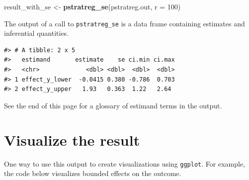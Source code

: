\documentclass[
]{book}
\newenvironment{Shaded}{\begin{snugshade}}{\end{snugshade}}
\newcommand{\AttributeTok}[1]{\textcolor[rgb]{0.13,0.29,0.53}{#1}}
\newcommand{\DecValTok}[1]{\textcolor[rgb]{0.00,0.00,0.81}{#1}}
\newcommand{\FunctionTok}[1]{\textcolor[rgb]{0.13,0.29,0.53}{\textbf{#1}}}
\newcommand{\NormalTok}[1]{#1}
\newcommand{\OtherTok}[1]{\textcolor[rgb]{0.56,0.35,0.01}{#1}}
\begin{document}
\begin{Shaded}
\begin{Highlighting}[]
\NormalTok{result\_with\_se }\OtherTok{\textless{}{-}} \FunctionTok{pstratreg\_se}\NormalTok{(pstratreg.out, }\AttributeTok{r =} \DecValTok{100}\NormalTok{)}
\end{Highlighting}
\end{Shaded}

The output of a call to \texttt{pstratreg\_se} is a data frame containing estimates and inferential quantities.

\begin{verbatim}
#> # A tibble: 2 x 5
#>   estimand       estimate    se ci.min ci.max
#>   <chr>             <dbl> <dbl>  <dbl>  <dbl>
#> 1 effect_y_lower  -0.0415 0.380 -0.786  0.703
#> 2 effect_y_upper   1.93   0.363  1.22   2.64
\end{verbatim}

See the end of this page for a glossary of estimand terms in the output.

\section{Visualize the result}\label{visualize-the-result}

One way to use this output to create visualizations using \texttt{ggplot}. For example, the code below visualizes bounded effects on the outcome.
\end{document}
